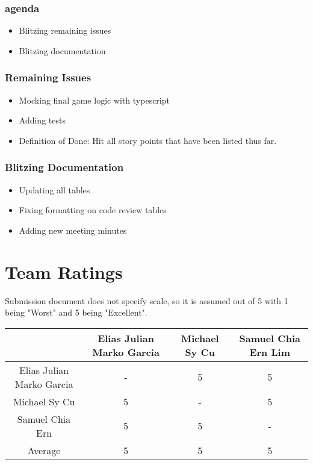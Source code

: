 \documentclass[11pt]{article}
\begin{document}
\subsubsection*{agenda}
\label{sec:orge3a07b3}
\begin{itemize}
\item Blitzing remaining issues
\item Blitzing documentation
\end{itemize}
\subsubsection*{Remaining Issues}
\label{sec:orga7f0f2d}
\begin{itemize}
\item Mocking final game logic with typescript
\item Adding tests
\item Definition of Done: Hit all story points that have been listed thus far.
\end{itemize}
\subsubsection*{Blitzing Documentation}
\label{sec:orgfdfc65b}
\begin{itemize}
\item Updating all tables
\item Fixing formatting on code review tables
\item Adding new meeting minutes
\end{itemize}
\section{Team Ratings}
\label{sec:orgda8dd33}
Submission document does not specify scale, so it is assumed out of 5 with 1 being "Worst" and 5
being "Excellent".

\begin{center}
\begin{tabular}{|c|c|c|c|}
\hline
 & Elias Julian Marko Garcia & Michael Sy Cu & Samuel Chia Ern Lim\\
\hline
Elias Julian Marko Garcia & - & 5 & 5\\
\hline
Michael Sy Cu & 5 & - & 5\\
\hline
Samuel Chia Ern & 5 & 5 & -\\
\hline
Average & 5 & 5 & 5\\
\hline
\end{tabular}
\end{center}
\end{document}
